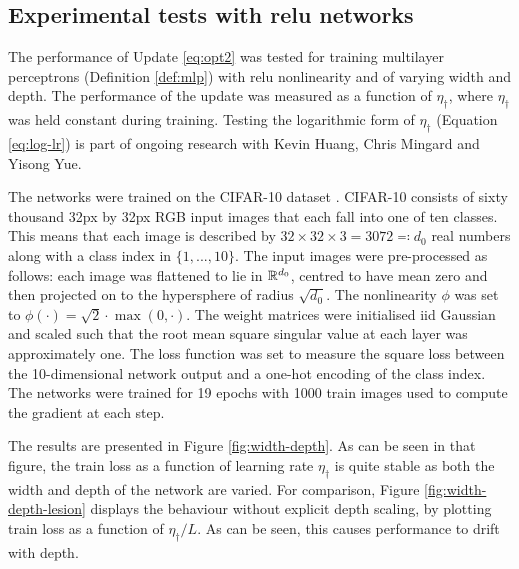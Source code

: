 \begin{refsection}
\section{Experimental tests with relu networks}

The performance of Update \ref{eq:opt2} was tested for training multilayer perceptrons (Definition \ref{def:mlp}) with relu nonlinearity and of varying width and depth. The performance of the update was measured as a function of $\eta_\dagger$, where $\eta_\dagger$ was held constant during training. Testing the logarithmic form of $\eta_\dagger$ (Equation \ref{eq:log-lr}) is part of ongoing research with Kevin Huang, Chris Mingard and Yisong Yue.

The networks were trained on the CIFAR-10 dataset \citep{Krizhevsky09learningmultiple}. CIFAR-10 consists of sixty thousand 32px by 32px RGB input images that each fall into one of ten classes. This means that each image is described by $32\times 32 \times 3 = 3072\eqqcolon d_0$ real numbers along with a class index in $\{1,...,10\}$. The input images were pre-processed as follows: each image was flattened to lie in $\mathbb{R}^{d_0}$, centred to have mean zero and then projected on to the hypersphere of radius $\sqrt{d_0}$. The nonlinearity $\phi$ was set to $\phi(\cdot)=\sqrt{2}\cdot\max(0,\cdot)$. The weight matrices were initialised iid Gaussian and scaled such that the root mean square singular value at each layer was approximately one. The loss function was set to measure the square loss between the 10-dimensional network output and a one-hot encoding of the class index. The networks were trained for 19 epochs with 1000 train images used to compute the gradient at each step.

The results are presented in Figure \ref{fig:width-depth}. As can be seen in that figure, the train loss as a function of learning rate $\eta_\dagger$ is quite stable as both the width and depth of the network are varied. For comparison, Figure \ref{fig:width-depth-lesion} displays the behaviour without explicit depth scaling, by plotting train loss as a function of $\eta_\dagger/L$. As can be seen, this causes performance to drift with depth.


\end{refsection}
